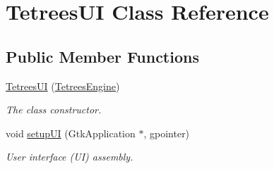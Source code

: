 \hypertarget{classTetreesUI}{}\section{Tetrees\+UI Class Reference}
\label{classTetreesUI}
\subsection*{Public Member Functions}
\begin{DoxyCompactItemize}
\item 
\hyperlink{classTetreesUI_ad6a5b91b1574c25c2bcd48601142013c}{Tetrees\+UI} (\hyperlink{classTetreesEngine}{Tetrees\+Engine})
\begin{DoxyCompactList}\small\item\em The class constructor. \end{DoxyCompactList}\item 
void \hyperlink{classTetreesUI_a492d68860089cfbe52c5756b2c3cd2ae}{setup\+UI} (Gtk\+Application $\ast$, gpointer)
\begin{DoxyCompactList}\small\item\em User interface (UI) assembly. \end{DoxyCompactList}\end{DoxyCompactItemize}

